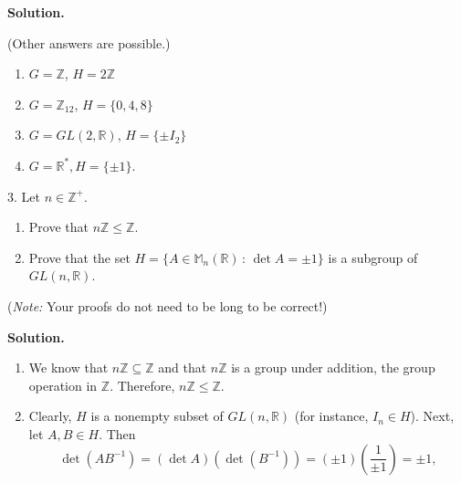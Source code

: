 \documentclass[10pt,]{book}
\theoremstyle{plain}
\theoremstyle{definition}
\theoremstyle{definition}
\theoremstyle{definition}
\theoremstyle{definition}
\numberwithin{equation}{section}
\def\Z{\mathbb{Z}}
\def\R{\mathbb{R}}
\def\M{\mathbb{M}}
\begin{document}
\begin{exerciselist}
\par\smallskip
\par\smallskip
\noindent\textbf{Solution.}\hypertarget{solution-29}{}\quad

      (Other answers are possible.)
      \leavevmode%
\begin{enumerate}[label=(\alph*)]
\item\hypertarget{li-221}{}
            \(G=\Z\), \(H=2\Z\)
\item\hypertarget{li-222}{}
            \(G=\Z_{12}\), \(H=\{0,4,8\}\)
\item\hypertarget{li-223}{}
            \(G=GL(2,\R)\), \(H=\{\pm I_2\}\)
\item\hypertarget{li-224}{}
            \(G=\R^*, H=\{\pm 1\}\).
\end{enumerate}

\item[3.]\hypertarget{exercise-30}{}
        Let \(n\in \Z^+\).
        \leavevmode%
\begin{enumerate}[label=(\alph*)]
\item\hypertarget{li-225}{}
              Prove that \(n\Z \leq \Z\).
\item\hypertarget{li-226}{}
              Prove that the set \(H=\{A\in \M_n(\R)\,:\,\det A=\pm 1\}\) is a subgroup of \(GL(n,\R)\).
\end{enumerate}

\par

        (\emph{Note:} Your proofs do not need to be long to be correct!)
\par\smallskip
\par\smallskip
\noindent\textbf{Solution.}\hypertarget{solution-30}{}\quad
\leavevmode%
\begin{enumerate}[label=(\alph*)]
\item\hypertarget{li-227}{}
          We know that \(n\Z\subseteq \Z\) and that \(n\Z\) is a group under addition, the group operation in \(\Z\).  Therefore, \(n\Z\leq \Z\).
\item\hypertarget{li-228}{}
          Clearly, \(H\) is a nonempty subset of \(GL(n,\R)\) (for instance, \(I_n\in H\)).  Next, let \(A,B\in H\).
          Then
\begin{equation*}

            \det(AB^{-1})=(\det A)(\det (B^{-1}))=(\pm 1)\left(\frac{1}{\pm 1}\right)=\pm 1,
          

\end{equation*}
\end{enumerate}
\end{exerciselist}
\end{document}

